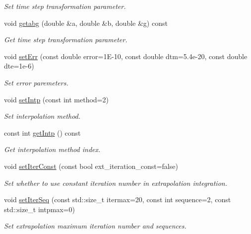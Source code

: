 \begin{DoxyCompactItemize}
\begin{DoxyCompactList}\small\item\em Set time step transformation parameter. \end{DoxyCompactList}\item 
void \hyperlink{classARC_1_1chainpars_af871d79733bc7ddca48297250be2101c}{getabg} (double \&a, double \&b, double \&g) const
\begin{DoxyCompactList}\small\item\em Get time step transformation parameter. \end{DoxyCompactList}\item 
void \hyperlink{classARC_1_1chainpars_a8da4d406d1ffcca23571f7dc55fd2a83}{set\+Err} (const double error=1\+E-\/10, const double dtm=5.\+4e-\/20, const double dte=1e-\/6)
\begin{DoxyCompactList}\small\item\em Set error paremeters. \end{DoxyCompactList}\item 
void \hyperlink{classARC_1_1chainpars_a66f11e6fde89ebdde2859223a1a29745}{set\+Intp} (const int method=2)
\begin{DoxyCompactList}\small\item\em Set interpolation method. \end{DoxyCompactList}\item 
const int \hyperlink{classARC_1_1chainpars_a83cbe423a9f64c3985b16bad8b9a601c}{get\+Intp} () const
\begin{DoxyCompactList}\small\item\em Get interpolation method index. \end{DoxyCompactList}\item 
void \hyperlink{classARC_1_1chainpars_ab235a48e936eadc412b72e4468106281}{set\+Iter\+Const} (const bool ext\+\_\+iteration\+\_\+const=false)
\begin{DoxyCompactList}\small\item\em Set whether to use constant iteration number in extrapolation integration. \end{DoxyCompactList}\item 
void \hyperlink{classARC_1_1chainpars_ae4a570ffa08b9beee98fc352f6e75b80}{set\+Iter\+Seq} (const std\+::size\+\_\+t itermax=20, const int sequence=2, const std\+::size\+\_\+t intpmax=0)
\begin{DoxyCompactList}\small\item\em Set extrapolation maximum iteration number and sequences. \end{DoxyCompactList}\item 

\end{DoxyCompactItemize}
